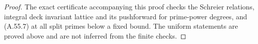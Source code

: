 \begin{proof}
The exact certificate accompanying this proof checks the
Schreier relations, integral deck invariant lattice and its
pushforward for prime-power degrees, and (A.55.7) at all
split primes below a fixed bound. The uniform statements are
proved above and are not inferred from the finite checks.
\end{proof}
